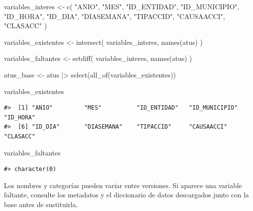 \documentclass[
  spanish,
  10.5pt,
  letterpaper,
  openany,
  headings=big]{scrbook}
\newenvironment{Shaded}{}{}
\newcommand{\FunctionTok}[1]{\textcolor[rgb]{0.44,0.26,0.76}{#1}}
\newcommand{\NormalTok}[1]{\textcolor[rgb]{0.14,0.16,0.18}{#1}}
\newcommand{\OtherTok}[1]{\textcolor[rgb]{0.44,0.26,0.76}{#1}}
\newcommand{\SpecialCharTok}[1]{\textcolor[rgb]{0.00,0.36,0.77}{#1}}
\newcommand{\StringTok}[1]{\textcolor[rgb]{0.01,0.18,0.38}{#1}}
\begin{document}
\begin{Shaded}
\begin{Highlighting}[]
\NormalTok{variables\_interes }\OtherTok{\textless{}{-}} \FunctionTok{c}\NormalTok{(}
  \StringTok{"ANIO"}\NormalTok{, }\StringTok{"MES"}\NormalTok{, }\StringTok{"ID\_ENTIDAD"}\NormalTok{, }\StringTok{"ID\_MUNICIPIO"}\NormalTok{,}
  \StringTok{"ID\_HORA"}\NormalTok{, }\StringTok{"ID\_DIA"}\NormalTok{, }\StringTok{"DIASEMANA"}\NormalTok{, }\StringTok{"TIPACCID"}\NormalTok{,}
  \StringTok{"CAUSAACCI"}\NormalTok{, }\StringTok{"CLASACC"}
\NormalTok{)}

\NormalTok{variables\_existentes }\OtherTok{\textless{}{-}} \FunctionTok{intersect}\NormalTok{(}
\NormalTok{  variables\_interes,}
  \FunctionTok{names}\NormalTok{(atus)}
\NormalTok{)}

\NormalTok{variables\_faltantes }\OtherTok{\textless{}{-}} \FunctionTok{setdiff}\NormalTok{(}
\NormalTok{  variables\_interes,}
  \FunctionTok{names}\NormalTok{(atus)}
\NormalTok{)}

\NormalTok{atus\_base }\OtherTok{\textless{}{-}}\NormalTok{ atus }\SpecialCharTok{|\textgreater{}}
  \FunctionTok{select}\NormalTok{(}\FunctionTok{all\_of}\NormalTok{(variables\_existentes))}

\NormalTok{variables\_existentes}
\end{Highlighting}
\end{Shaded}

\begin{verbatim}
#>  [1] "ANIO"         "MES"          "ID_ENTIDAD"   "ID_MUNICIPIO" "ID_HORA"     
#>  [6] "ID_DIA"       "DIASEMANA"    "TIPACCID"     "CAUSAACCI"    "CLASACC"
\end{verbatim}

\begin{Shaded}
\begin{Highlighting}[]
\NormalTok{variables\_faltantes}
\end{Highlighting}
\end{Shaded}

\begin{verbatim}
#> character(0)
\end{verbatim}

\begin{tcolorbox}[enhanced jigsaw, arc=.35mm, bottomrule=.15mm, bottomtitle=1mm, breakable, colback=white, colbacktitle=quarto-callout-warning-color!10!white, colframe=quarto-callout-warning-color-frame, coltitle=black, left=2mm, leftrule=.75mm, opacityback=0, opacitybacktitle=0.6, rightrule=.15mm, title=\textcolor{quarto-callout-warning-color}{\faExclamationTriangle}\hspace{0.5em}{Compruebe el diccionario de datos}, titlerule=0mm, toprule=.15mm, toptitle=1mm]

Los nombres y categorías pueden variar entre versiones. Si aparece una
variable faltante, consulte los metadatos y el diccionario de datos
descargados junto con la base antes de sustituirla.

\end{tcolorbox}
\end{document}
